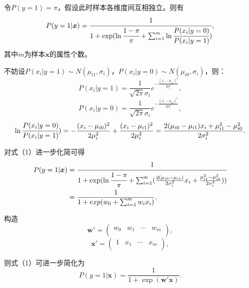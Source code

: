 \documentclass[withoutpreface,bwprint]{cumcmthesis}
\begin{document}
令$ P(y=1)=\pi $，假设此时样本各维度间互相独立。则有
\begin{equation}
P(y=1|\boldsymbol{x})=\cfrac{1}{1+\exp(\ln\cfrac{1-\pi}{\pi}+\sum_{i=1}^{m}\ln\cfrac{P(x_{i}|y=0)}{P(x_{i}|y=1)})},
\end{equation}
其中$m$为样本$\boldsymbol{x}$的属性个数。

不妨设$P(x_{i}|y=1)\sim N(\mu_{i1},\sigma_{i})$，$P(x_{i}|y=0)\sim N(\mu_{i0},\sigma_{i})$，则：
\begin{equation*}
P(x_{i}|y=1)=\frac{1}{\sqrt{2\pi}\sigma_{i}}e^{-\frac{(x_{i}-\mu_{i1})^{2}}{2\mu_{i}^{2}}},
\end{equation*}
\begin{equation*}
P(x_{i}|y=0)=\frac{1}{\sqrt{2\pi}\sigma_{i}}e^{-\frac{(x_{i}-\mu_{i0})^{2}}{2\mu_{i}^{2}}},
\end{equation*}
\begin{equation*}
\ln\cfrac{P(x_{i}|y=0)}{P(x_{i}|y=1)})=-\frac{(x_{i}-\mu_{i0})^{2}}{2\mu_{i}^{2}}+\frac{(x_{i}-\mu_{i1})^{2}}{2\mu_{i}^{2}}=\frac{2(\mu_{i0}-\mu_{i1})x_{i}+\mu_{i1}^{2}-\mu_{i0}^{2}}{2\sigma_{i}^{2}}.
\end{equation*}

对式（1）进一步化简可得
\begin{equation*}
\begin{aligned}
P(y=1|\boldsymbol{x})&=\cfrac{1}{1+\exp(\ln\cfrac{1-\pi}{\pi}+\sum_{i=1}^{m}
(\frac{2(\mu_{i0}-\mu_{i1})}{2\sigma_{i}^{2}}x_{i}+\frac{\mu_{i1}^{2}-\mu_{i0}^{2}}{2\sigma_{i}^{2}}))}\\
&=\frac{1}{1+exp(w_{0}+\sum_{i=1}^{m}w_{i}x_{i})}.
\end{aligned}
\end{equation*}

构造
\begin{equation*}
\boldsymbol{w}'=\begin{pmatrix}
w_{0} & w_{1} &\cdots & w_{m}\\
\end{pmatrix},
\end{equation*}
\begin{equation*}
\boldsymbol{x}'=\begin{pmatrix}
1 & x_{1} &\cdots & x_{m}\\
\end{pmatrix},
\end{equation*}

则式（1）可进一步简化为
\begin{equation*}
P(y=1|\boldsymbol{x})=\frac{1}{1+\exp(\boldsymbol{w}'\boldsymbol{x})}.
\end{equation*}
\end{document}
